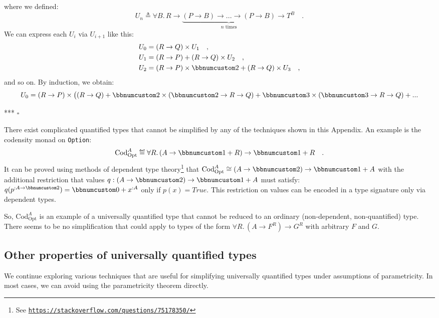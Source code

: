where we defined:
\[
U_{n}\triangleq\forall B.\,R\rightarrow\underbrace{(P\rightarrow B)\rightarrow...\rightarrow(P\rightarrow B)}_{n\text{ times}}\rightarrow T^{B}\quad.
\]
We can express each $U_{i}$ via $U_{i+1}$ like this:
\begin{align*}
 & U_{0}=(R\rightarrow Q)\times U_{1}\quad,\\
 & U_{1}=(R\rightarrow P)+(R\rightarrow Q)\times U_{2}\quad,\\
 & U_{2}=(R\rightarrow P)\times\bbnum 2+(R\rightarrow Q)\times U_{3}\quad,
\end{align*}
and so on. By induction, we obtain:
\[
U_{0}=(R\rightarrow P)\times\big((R\rightarrow Q)+\bbnum 2\times(\bbnum 2\rightarrow R\rightarrow Q)+\bbnum 3\times(\bbnum 3\rightarrow R\rightarrow Q)+...
\]

{*}{*}{*} $\square$

There exist complicated quantified types that cannot be simplified
by any of the techniques shown in this Appendix. An example is the
codensity monad on \lstinline!Option!:
\[
\text{Cod}_{\text{Opt}}^{A}\triangleq\forall R.\,(A\rightarrow\bbnum 1+R)\rightarrow\bbnum 1+R\quad.
\]
It can be proved using methods of dependent type theory\footnote{See \texttt{\href{https://stackoverflow.com/questions/75178350/}{https://stackoverflow.com/questions/75178350/}}}
that $\text{Cod}_{\text{Opt}}^{A}\cong(A\rightarrow\bbnum 2)\rightarrow\bbnum 1+A$
with the additional restriction that values $q:(A\rightarrow\bbnum 2)\rightarrow\bbnum 1+A$
must satisfy: $q(p^{:A\rightarrow\bbnum 2})=\bbnum 0+x^{:A}$ only
if $p(x)=True$. This restriction on values can be encoded in a type
signature only via dependent types.

So, $\text{Cod}_{\text{Opt}}^{A}$ is an example of a universally
quantified type that cannot be reduced to an ordinary (non-dependent,
non-quantified) type. There seems to be no simplification that could
apply to types of the form $\forall R.\,(A\rightarrow F^{R})\rightarrow G^{R}$
with arbitrary $F$ and $G$.

\subsection{Other properties of universally quantified types}

We continue exploring various techniques that are useful for simplifying
universally quantified types under assumptions of parametricity. In
most cases, we can avoid using the parametricity theorem directly.


